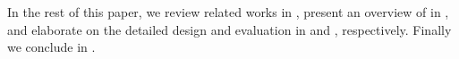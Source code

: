 In the rest of this paper, we review related works in , present an overview of \sysname in , and elaborate on the detailed design and evaluation in  and , respectively.
Finally we conclude in .

